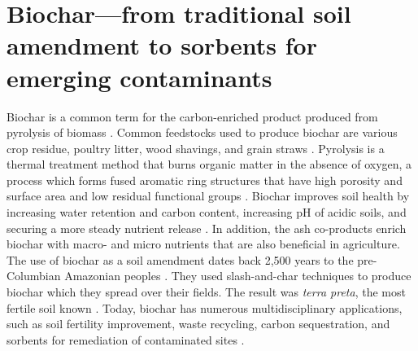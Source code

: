 \section{Biochar---from traditional soil amendment to sorbents for emerging contaminants}
Biochar is a common term for the carbon-enriched product produced from pyrolysis of biomass \citep{LehmannAndJoseph2015}. Common feedstocks used to produce biochar are various crop residue, poultry litter, wood shavings, and grain straws \citep{Ahmad2014}. Pyrolysis is a thermal treatment method that burns organic matter in the absence of oxygen, a process which forms fused aromatic ring structures that have high porosity and surface area and low residual functional groups \citep{LehmannAndJoseph2015}. Biochar improves soil health by increasing water retention and carbon content, increasing pH of acidic soils, and securing a more steady nutrient release \citep{das2020application}. In addition, the ash co-products enrich biochar with macro- and micro nutrients that are also beneficial in agriculture. The use of biochar as a soil amendment dates back 2,500 years to the pre-Columbian Amazonian peoples \citep{Tindall2017}. They used slash-and-char techniques to produce biochar which they spread over their fields. The result was \textit{terra preta}, the most fertile soil known \citep{Ahmad2014}. Today, biochar has numerous multidisciplinary applications, such as soil fertility improvement, waste recycling, carbon sequestration, and sorbents for remediation of contaminated sites \citep{beesley2011review}.

